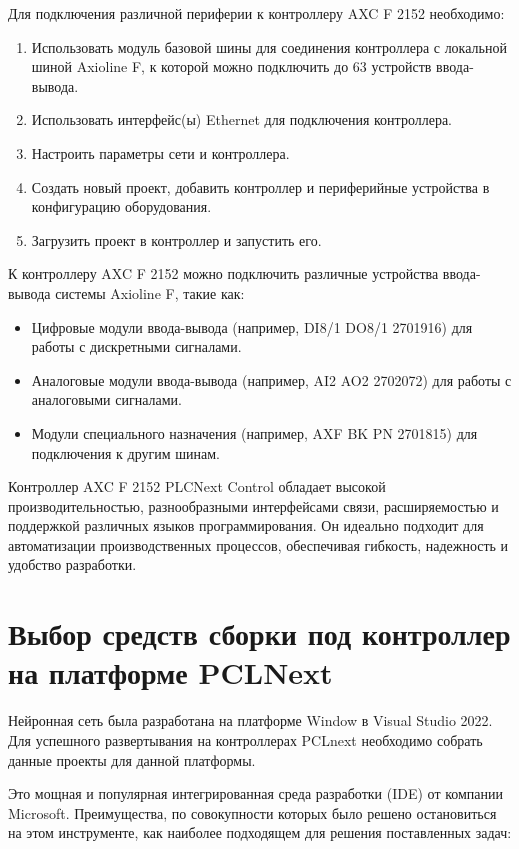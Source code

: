 Для подключения различной периферии к контроллеру AXC F 2152 необходимо:

\begin{enumerate} 
    \item Использовать модуль базовой шины для соединения контроллера с локальной шиной Axioline F, к которой можно подключить до 63 устройств ввода-вывода.
    \item Использовать интерфейс(ы) Ethernet для подключения контроллера.
    \item Настроить параметры сети и контроллера.
    \item Создать новый проект, добавить контроллер и периферийные устройства в конфигурацию оборудования.
    \item Загрузить проект в контроллер и запустить его.
\end{enumerate}

К контроллеру AXC F 2152 можно подключить различные устройства ввода-вывода системы Axioline F, такие как:

\begin{itemize}
    \item[-] Цифровые модули ввода-вывода (например, DI8/1 DO8/1 2701916) для работы с дискретными сигналами. 
    \item[-] Аналоговые модули ввода-вывода (например, AI2 AO2 2702072) для работы с аналоговыми сигналами. 
    \item[-] Модули специального назначения (например, AXF BK PN 2701815) для подключения к другим шинам.
\end{itemize}

Контроллер AXC F 2152 PLCNext Control обладает высокой производительностью, разнообразными интерфейсами связи, расширяемостью и поддержкой различных языков программирования. Он идеально подходит для автоматизации производственных процессов, обеспечивая гибкость, надежность и удобство разработки.

\section{Выбор средств сборки под контроллер на платформе PCLNext}

Нейронная сеть была разработана на платформе Window в Visual Studio 2022. Для успешного развертывания на контроллерах PCLnext необходимо собрать данные проекты для данной платформы.
	
Это мощная и популярная интегрированная среда разработки (IDE) от компании Microsoft. Преимущества, по совокупности которых было решено остановиться на этом инструменте, как наиболее подходящем для решения поставленных задач:

